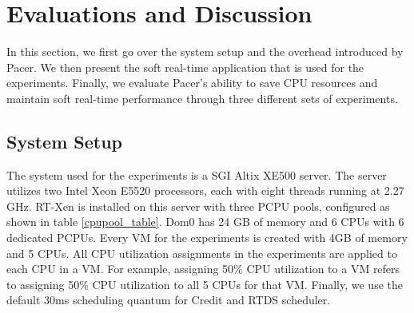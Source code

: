 \section{Evaluations and Discussion}
\label{se} 

In this section, we first go over the system setup and the overhead introduced by Pacer. We then present the soft real-time application that is used for the experiments. Finally, we evaluate Pacer's ability to save CPU resources and maintain soft real-time performance through three different sets of experiments.


\subsection{System Setup}

The system used for the experiments is a SGI Altix XE500 server. The server utilizes two Intel Xeon E5520 processors, each with eight threads running at 2.27 GHz. RT-Xen is installed on this server with three PCPU pools, configured as shown in table \ref{cpupool_table}. Dom0 has 24 GB of memory and 6 CPUs with 6 dedicated PCPUs. Every VM for the experiments is created with 4GB of memory and 5 CPUs. All CPU utilization assignments in the experiments are applied to each CPU in a VM. For example, assigning 50\% CPU utilization to a VM refers to assigning 50\% CPU utilization to all 5 CPUs for that VM. Finally, we use the default 30ms scheduling quantum for Credit and RTDS scheduler.

